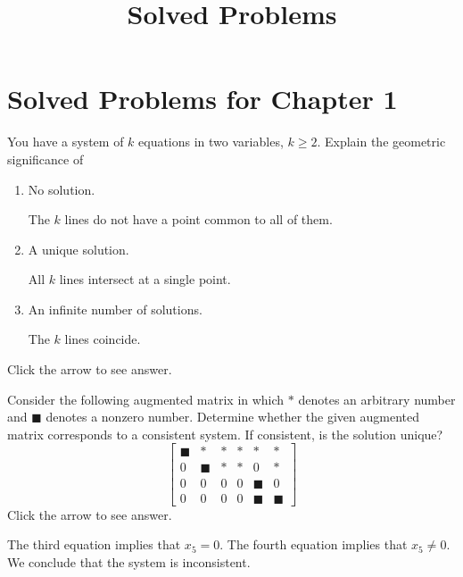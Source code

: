 \documentclass{ximera}
\title{Solved Problems} \license{CC BY-NC-SA 4.0}
\begin{document}
\begin{abstract}
\end{abstract}
\maketitle

\section*{Solved Problems for Chapter 1}


\begin{problem}\label{prb:2.3} You have a system of $k$ equations in two variables, $k\geq 2$.
Explain the geometric significance of

\begin{enumerate}
\item No solution.

\begin{expandable}
    The $k$ lines do not have a point common to all of them.
\end{expandable}
\item A unique solution.

\begin{expandable}
    All $k$ lines intersect at a single point.
\end{expandable}
\item An infinite number of solutions.

\begin{expandable}
    The $k$ lines coincide.
\end{expandable}
\end{enumerate}
Click the arrow to see answer.

\end{problem}

\begin{problem}\label{prb:2.7}
Consider the following augmented matrix in which $\ast $ denotes an arbitrary
number and $\blacksquare $ denotes a nonzero number. Determine whether the
given augmented matrix corresponds to a consistent system. If consistent, is the solution unique?
\begin{equation*}
\left[
\begin{array}{ccccc|c}
\blacksquare & \ast & \ast & \ast & \ast & \ast \\
0 & \blacksquare & \ast & \ast & 0 & \ast \\
0 & 0 & 0 & 0 & \blacksquare & 0 \\
0 & 0 & 0 & 0 & \blacksquare & \blacksquare
\end{array}
\right]
\end{equation*}
Click the arrow to see answer. 
\begin{expandable}
The third equation implies that $x_5 = 0$.  The fourth equation implies that $x_5 \ne 0$.  We conclude that the system is inconsistent.
\end{expandable}
\end{problem}
\end{document}

